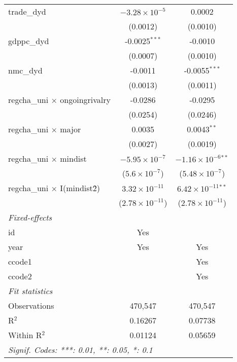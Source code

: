 \begin{tabular}{lcc}
   trade\_dyd                            & $-3.28\times 10^{-5}$    & 0.0002\\   
                                         & (0.0012)                 & (0.0010)\\   
   gdppc\_dyd                            & -0.0025$^{***}$          & -0.0010\\   
                                         & (0.0007)                 & (0.0010)\\   
   nmc\_dyd                              & -0.0011                  & -0.0055$^{***}$\\   
                                         & (0.0013)                 & (0.0011)\\   
   regcha\_uni $\times$ ongoingrivalry   & -0.0286                  & -0.0295\\   
                                         & (0.0254)                 & (0.0246)\\   
   regcha\_uni $\times$ major            & 0.0035                   & 0.0043$^{**}$\\   
                                         & (0.0027)                 & (0.0019)\\   
   regcha\_uni $\times$ mindist          & $-5.95\times 10^{-7}$    & $-1.16\times 10^{-6}$$^{**}$\\    
                                         & ($5.6\times 10^{-7}$)    & ($5.48\times 10^{-7}$)\\    
   regcha\_uni $\times$ I(mindist\^2)    & $3.32\times 10^{-11}$    & $6.42\times 10^{-11}$$^{**}$\\    
                                         & ($2.78\times 10^{-11}$)  & ($2.78\times 10^{-11}$)\\    
   \midrule
   \emph{Fixed-effects}\\
   id                                    & Yes                      & \\  
   year                                  & Yes                      & Yes\\  
   ccode1                                &                          & Yes\\  
   ccode2                                &                          & Yes\\  
   \midrule
   \emph{Fit statistics}\\
   Observations                          & 470,547                  & 470,547\\  
   R$^2$                                 & 0.16267                  & 0.07738\\  
   Within R$^2$                          & 0.01124                  & 0.05659\\  
   \midrule \midrule
   \multicolumn{3}{l}{\emph{Signif. Codes: ***: 0.01, **: 0.05, *: 0.1}}\\
\end{tabular}
\par\endgroup


